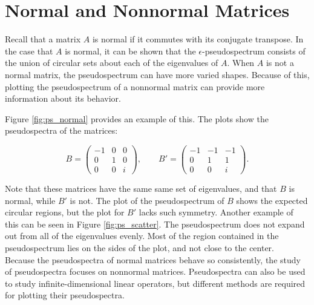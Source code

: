 \section*{Normal and Nonnormal Matrices}
Recall that a matrix $A$ is normal if it commutes with its conjugate transpose. In the case that $A$ is normal, it can be shown that the $\epsilon$-pseudospectrum consists of the union of circular sets about each of the eigenvalues of $A$. When $A$ is not a normal matrix, the pseudospectrum can have more varied shapes. Because of this, plotting the pseudospectrum of a nonnormal matrix can provide more information about its behavior.

Figure \ref{fig:ps_normal} provides an example of this. The plots show the pseudospectra of the matrices:

\begin{equation}
	B = \begin{pmatrix}
		-1 & 0 & 0\\
		0 & 1 & 0\\
		0 & 0 & i
	\end{pmatrix}, \qquad 	B' = \begin{pmatrix}
		-1 & -1 & -1\\
		0 & 1 & 1\\
		0 & 0 & i
	\end{pmatrix}.
\end{equation}

Note that these matrices have the same same set of eigenvalues, and that $B$ is normal, while $B'$ is not. The plot of the pseudospectrum of $B$ shows the expected circular regions, but the plot for $B'$ lacks such symmetry. Another example of this can be seen in Figure \ref{fig:ps_scatter}. The pseudospectrum does not expand out from all of the eigenvalues evenly. Most of the region contained in the pseudospectrum lies on the sides of the plot, and not close to the center.\\

Because the pseudospectra of normal matrices behave so consistently, the study of pseudospectra focuses on nonnormal matrices. Pseudospectra can also be used to study infinite-dimensional linear operators, but different methods are required for plotting their pseudospectra.

